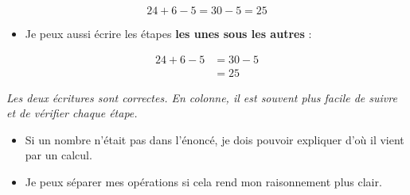 \documentclass[10pt,a4paper]{article}
\begin{document}
\begin{minipage}[t]{0.485\textwidth}
\begin{tcolorbox}
\vspace{-0.25em}

\[
24+6-5 = 30-5 = 25
\]

\vspace{-0.4em}

\begin{itemize}
  \item Je peux aussi écrire les étapes \textbf{les unes sous les autres} :
\end{itemize}

\vspace{-0.25em}

\[
\begin{aligned}
24+6-5 &= 30-5\\
       &= 25
\end{aligned}
\]

\vspace{-0.4em}

\begin{center}
\scriptsize\itshape
Les deux écritures sont correctes.
En colonne, il est souvent plus facile de suivre et de vérifier chaque étape.
\end{center}

\vspace{-0.25em}

\begin{itemize}
  \item Si un nombre n'était pas dans l'énoncé, je dois pouvoir expliquer d'où il vient par un calcul.

  \item Je peux séparer mes opérations si cela rend mon raisonnement plus clair.
\end{itemize}

\end{tcolorbox}

\end{minipage}
\hfill
\end{document}
